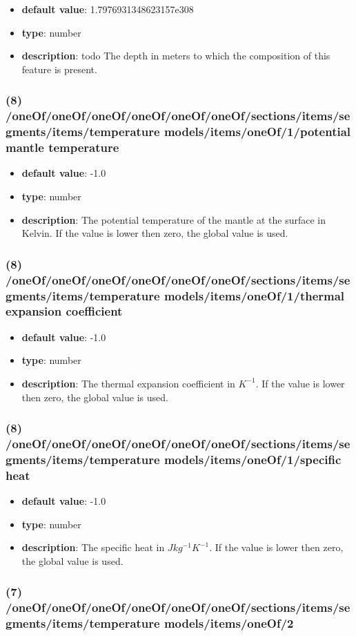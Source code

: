 \begin{itemize}[leftmargin=8em]\item {\bf default value}: 1.7976931348623157e308
\item {\bf type}: number
\item {\bf description}: todo The depth in meters to which the composition of this feature is present.
\end{itemize}\subsubsection{(8) /oneOf/oneOf/oneOf/oneOf/oneOf/oneOf/sections/items/segments/items/temperature models/items/oneOf/1/potential mantle temperature}
\begin{itemize}[leftmargin=8em]\item {\bf default value}: -1.0
\item {\bf type}: number
\item {\bf description}: The potential temperature of the mantle at the surface in Kelvin. If the value is lower then zero, the global value is used.
\end{itemize}\subsubsection{(8) /oneOf/oneOf/oneOf/oneOf/oneOf/oneOf/sections/items/segments/items/temperature models/items/oneOf/1/thermal expansion coefficient}
\begin{itemize}[leftmargin=8em]\item {\bf default value}: -1.0
\item {\bf type}: number
\item {\bf description}: The thermal expansion coefficient in $K^{-1}$. If the value is lower then zero, the global value is used.
\end{itemize}\subsubsection{(8) /oneOf/oneOf/oneOf/oneOf/oneOf/oneOf/sections/items/segments/items/temperature models/items/oneOf/1/specific heat}
\begin{itemize}[leftmargin=8em]\item {\bf default value}: -1.0
\item {\bf type}: number
\item {\bf description}: The specific heat in $J kg^{-1} K^{-1}$. If the value is lower then zero, the global value is used.
\end{itemize}\subsubsection{(7) /oneOf/oneOf/oneOf/oneOf/oneOf/oneOf/sections/items/segments/items/temperature models/items/oneOf/2}
